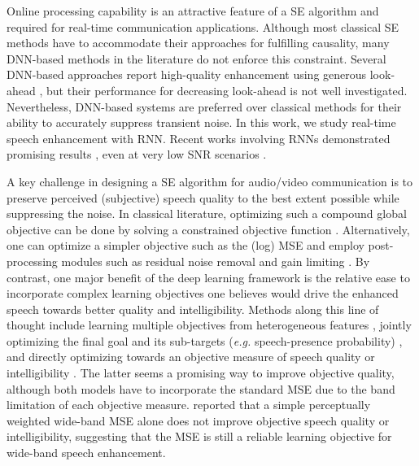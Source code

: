 \documentclass{article}
\begin{document}
Online processing capability is an attractive feature of a SE algorithm and required for real-time communication applications. Although most classical SE methods have to accommodate their approaches \cite{cohen2002noise,cohen2001speech,ephraim1984speech,boll1979suppression} for fulfilling causality, many DNN-based methods in the literature \cite{wang2014training,ephrat2018looking,Pascual2017} do not enforce this constraint. Several DNN-based approaches report high-quality enhancement using generous look-ahead \cite{ephrat2018looking,Pascual2017}, but their performance for decreasing look-ahead is not well investigated. Nevertheless, DNN-based systems are preferred over classical methods for their ability to accurately suppress transient noise. In this work, we study real-time speech enhancement with \ac{RNN}. Recent works involving RNNs demonstrated promising results \cite{valin2018hybrid}, even at very low \ac{SNR} scenarios \cite{tan2018convolutional,xia2018priori}.

A key challenge in designing a SE algorithm for audio/video communication is to preserve perceived (subjective) speech quality to the best extent possible while suppressing the noise. In classical literature, optimizing such a compound global objective can be done by solving a constrained objective function \cite{braun2015}. Alternatively, one can optimize a simpler objective such as the (log) \ac{MSE} \cite{ephraim1984speech,ephraim1985speech} and employ post-processing modules such as residual noise removal \cite{boll1979suppression} and gain limiting \cite{esch2009}. By contrast, one major benefit of the deep learning framework is the relative ease to incorporate complex learning objectives one believes would drive the enhanced speech towards better quality and intelligibility. Methods along this line of thought include learning multiple objectives from heterogeneous features \cite{sun2017multiple,xu2015multi,Germain2019}, jointly optimizing the final goal and its sub-targets (\emph{e.g.} speech-presence probability) \cite{valin2018hybrid,xia2018priori}, and directly optimizing towards an objective measure of speech quality or intelligibility \cite{martin2018deep,zhao2018perceptually}. The latter seems a promising way to improve objective quality, although both models have to incorporate the standard \ac{MSE} due to the band limitation of each objective measure. \cite{Kumar+2016} reported that a simple perceptually weighted wide-band \ac{MSE} alone does not improve objective speech quality or intelligibility, suggesting that the \ac{MSE} is still a reliable learning objective for wide-band speech enhancement.
\end{document}
